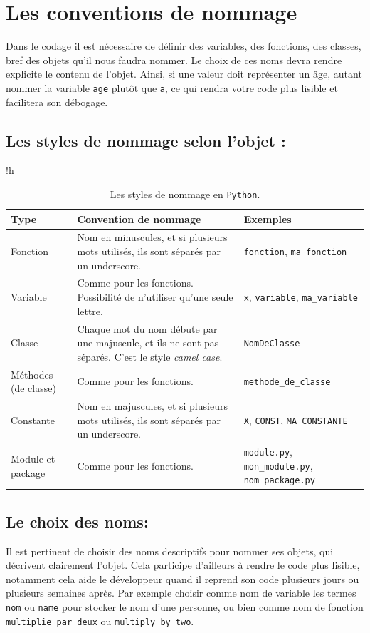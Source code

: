 \documentclass[a4paper,12pt]{book}
\begin{document}
\section{Les conventions de nommage}
Dans le codage il est nécessaire de définir des variables, des fonctions, des classes, bref des objets qu'il nous faudra nommer. Le choix de ces noms devra rendre explicite le contenu de l'objet. Ainsi, si une valeur doit représenter un âge, autant nommer la variable \texttt{age} plutôt que \texttt{a}, ce qui rendra votre code plus lisible et facilitera son débogage.

\subsection*{Les styles de nommage selon l'objet :}
\begin{table}{!h}
\begin{center}
\begin{tabular}{|p{2cm}|p{7cm}|p{3cm}|}
\hline
\textbf{Type} & \textbf{Convention de nommage} & \textbf{Exemples} \\
\hline
Fonction & Nom en minuscules, et si plusieurs mots utilisés, ils sont séparés par un underscore. & \texttt{fonction}, \texttt{ma\_fonction} \\
\hline
Variable & Comme pour les fonctions. Possibilité de n'utiliser qu'une seule lettre. & \texttt{x}, \texttt{variable}, \texttt{ma\_variable} \\
\hline
Classe & Chaque mot du nom débute par une majuscule, et ils ne sont pas séparés. C'est le style \textit{camel case}. & \texttt{NomDeClasse} \\
\hline
Méthodes (de classe) & Comme pour les fonctions. & \texttt{methode\_de\_classe} \\
\hline
Constante & Nom en majuscules, et si plusieurs mots utilisés, ils sont séparés par un underscore. & \texttt{X}, \texttt{CONST}, \texttt{MA\_CONSTANTE} \\
\hline
Module  et package & Comme pour les fonctions. & \texttt{module.py}, \texttt{mon\_module.py}, \texttt{nom\_package.py} \\
\hline
\end{tabular}
\caption{Les styles de nommage en \texttt{Python}.}
\end{center}
\end{table}
\medskip

\subsection*{Le choix des noms:}
Il est pertinent de choisir des noms descriptifs pour nommer ses objets, qui décrivent clairement l'objet. Cela participe d'ailleurs à rendre le code plus lisible, notamment cela aide le développeur quand il reprend son code plusieurs jours ou plusieurs semaines après. Par exemple choisir comme nom de variable les termes \texttt{nom} ou \texttt{name} pour stocker le nom d'une personne, ou bien comme nom de fonction \texttt{multiplie\_par\_deux} ou \texttt{multiply\_by\_two}.
\medskip
\end{document}
